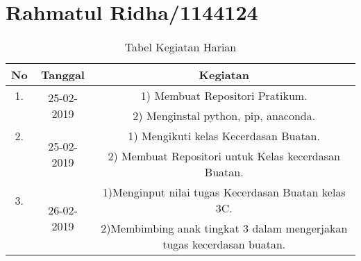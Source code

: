 \chapter{Rahmatul Ridha/1144124}

\begin{table}[h]
\caption{Tabel Kegiatan Harian}
\centering
\begin{tabular}{|c|c|c|}
\hline
No&Tanggal&Kegiatan\\
\hline
1.&\multirow{2}{*}{25-02-2019}&1) Membuat Repositori Pratikum.\\
&&2) Menginstal python, pip, anaconda.\\
\hline
2.&\multirow{2}{*}{25-02-2019}&1) Mengikuti kelas Kecerdasan Buatan.\\
&&2) Membuat Repositori untuk Kelas kecerdasan Buatan.\\
\hline
3.&\multirow{2}{*}{26-02-2019}&1)Menginput nilai tugas Kecerdasan Buatan kelas 3C.\\
&&2)Membimbing anak tingkat 3 dalam mengerjakan tugas kecerdasan buatan.\\
\hline
\end{tabular}
\label{table:contoh}
\end{table}
